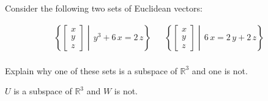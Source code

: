 
\begin{exerciseStatement}


Consider the following two sets of Euclidean vectors: 


\begin{align*}  \left\{ \left[\begin{array}{c}
x \\
y \\
z
\end{array}\right] \middle|\,y^{3} + 6 \, x = 2 \, z\right\}  & &   \left\{ \left[\begin{array}{c}
x \\
y \\
z
\end{array}\right] \middle|\,6 \, x = 2 \, y + 2 \, z\right\}  \\ \end{align*}
            

 Explain why one of these sets is a subspace of \(\mathbb{R}^ 3 \) and one is not. 


\end{exerciseStatement}
    
\begin{exerciseAnswer} 


\(U\) is a subspace of \(\mathbb{R}^ 3 \) and \(W\) is not.


\end{exerciseAnswer}
    
